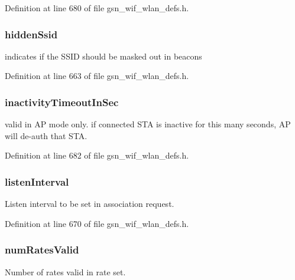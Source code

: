 Definition at line 680 of file gsn\_\-wif\_\-wlan\_\-defs.h.

\hypertarget{a00374_a382a496c170fb8bfac376161ed8d00e6}{
\subsubsection[{hiddenSsid}]{ {\bf hiddenSsid}}}
\label{a00374_a382a496c170fb8bfac376161ed8d00e6}
indicates if the SSID should be masked out in beacons 

Definition at line 663 of file gsn\_\-wif\_\-wlan\_\-defs.h.

\hypertarget{a00374_a6f21209eb61935400e9b58ac8c43913c}{
\subsubsection[{inactivityTimeoutInSec}]{ {\bf inactivityTimeoutInSec}}}
\label{a00374_a6f21209eb61935400e9b58ac8c43913c}
valid in AP mode only. if connected STA is inactive for this many seconds, AP will de-\/auth that STA. 

Definition at line 682 of file gsn\_\-wif\_\-wlan\_\-defs.h.

\hypertarget{a00374_a6429fe517dc48f11feaf8351ddf5c934}{
\subsubsection[{listenInterval}]{ {\bf listenInterval}}}
\label{a00374_a6429fe517dc48f11feaf8351ddf5c934}
Listen interval to be set in association request. 

Definition at line 670 of file gsn\_\-wif\_\-wlan\_\-defs.h.

\hypertarget{a00374_a3c016113d244f6915211b9103557ac84}{
\subsubsection[{numRatesValid}]{ {\bf numRatesValid}}}
\label{a00374_a3c016113d244f6915211b9103557ac84}
Number of rates valid in rate set. 

